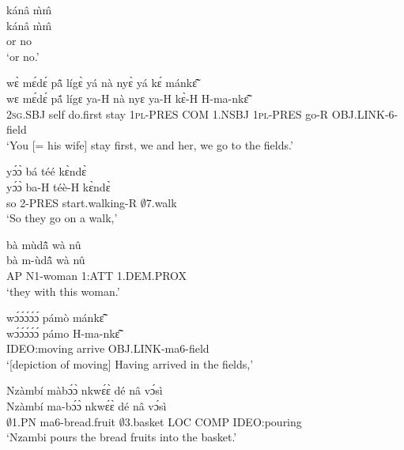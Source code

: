 \begin{exe} 
\exN\label{52}
  \glll kánâ m̀m̂ \\
      kánâ m̀m̂  \\
         or no   \\
    \trans `or no.'
\end{exe}

\begin{exe} 
\exN\label{53}
  \glll   wɛ̀ mɛ́dɛ́ pã̂ lígɛ̀ yá nà nyɛ̀ yá kɛ́ mánkɛ̃̂\\
         wɛ mɛ́dɛ́ pã́ lígɛ ya-H nà nyɛ ya-H kɛ̀-H H-ma-nkɛ̃̂\\
           2\textsc{sg}.SBJ self do.first stay 1\textsc{pl}-PRES COM 1.NSBJ  1\textsc{pl}-PRES go-R OBJ.LINK-6-field\\
    \trans `You [= his wife] stay first, we and her, we go to the fields.'
\end{exe}

\begin{exe} 
\exN\label{54} 
  \glll yɔ́ɔ̀ bá téé kɛ̀ndɛ̀ \\
        yɔ́ɔ̀ ba-H téè-H kɛ̀ndɛ̀ \\
         so 2-PRES start.walking-R $\emptyset$7.walk   \\
    \trans `So they go on a walk,'
\end{exe}

\begin{exe} 
\exN\label{55}
  \glll bà mùdã̂ wà nû \\
       bà m-ùdã̂ wà nû \\
          AP N1-woman 1:ATT 1.DEM.PROX  \\
    \trans `they with this woman.'
\end{exe}

\begin{exe} 
\exN\label{56}
  \glll wɔ́ɔ́ɔ́ɔ́ɔ́ pámò mánkɛ̃̂ \\
        wɔ́ɔ́ɔ́ɔ́ɔ́ pámo H-ma-nkɛ̃̂ \\
        IDEO:moving arrive OBJ.LINK-ma6-field    \\
    \trans `[depiction of moving] Having arrived in the fields,'
\end{exe}

\begin{exe} 
\exN\label{57}
  \glll Nzàmbí màbɔ́ɔ̀ nkwɛ́ɛ̀ dé nâ vɔ́sì \\
        Nzàmbí ma-bɔ́ɔ̀ nkwɛ́ɛ̀ dé nâ vɔ́sì \\
          $\emptyset$1.PN ma6-bread.fruit $\emptyset$3.basket LOC COMP IDEO:pouring\\
    \trans `Nzambi pours the bread fruits into the basket.'
\end{exe}

